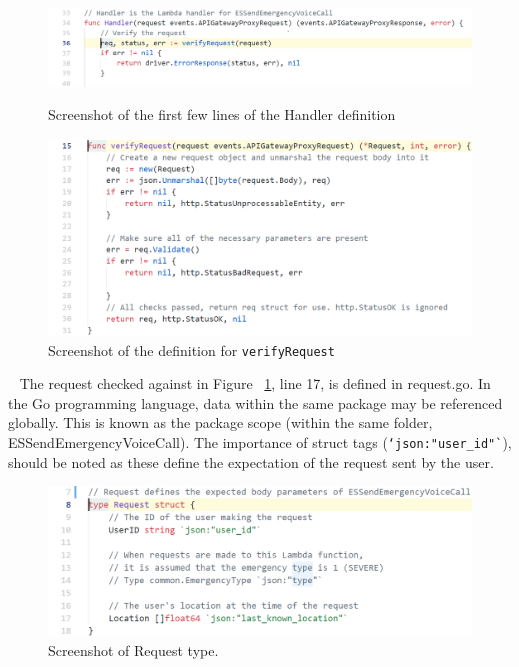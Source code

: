 \documentclass[10pt, a4paper]{article}
\begin{document}
\begin{figure}[H]
  \ \includegraphics[scale=.6]{code-screenshots/five.png}
  \caption{Screenshot of the first few lines of the Handler definition}
\end{figure}

\begin{figure}[H]
  \includegraphics[scale=.6]{code-screenshots/six.png}
  \caption{Screenshot of the definition for \texttt{verifyRequest}}\label{fig:vr}
\end{figure}

\par ~ The request checked against in Figure ~\ref{fig:vr}, line 17, is defined in request.go. In the Go programming language, data within the same package may be referenced globally. This is known as the package scope (within the same folder, ESSendEmergencyVoiceCall). The importance of struct tags (\texttt{`json:"user\_id"`}), should be noted as these define the expectation of the request sent by the user.

\begin{figure}[H]
  \includegraphics[scale=.6]{code-screenshots/eight.png}
  \caption{Screenshot of Request type.}
\end{figure}
\end{document}
